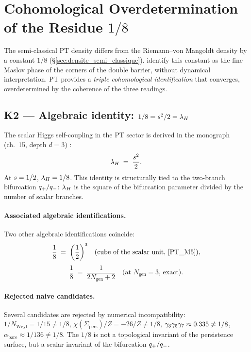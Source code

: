 \section{Cohomological Overdetermination of the Residue $1/8$}
\label{sec:surdetermination_un_huitieme}

The semi-classical PT density differs from the Riemann--von Mangoldt
density by a constant $1/8$ (\S\ref{sec:densite_semi_classique}).
\citeauthor{BerryKeating1999} \citeyear{BerryKeating1999} identify
this constant as the fine Maslov phase of the corners of the double
barrier, without dynamical interpretation. PT provides a \emph{triple
cohomological identification} that converges, overdetermined by the
coherence of the three readings.

\subsection{K2 --- Algebraic identity: $1/8 = s^{2}/2 = \lambda_H$}
\label{sec:K2}

The scalar Higgs self-coupling in the PT sector is derived in the
monograph (ch.~15, depth $d = 3$) \cite{PT_Foundations}:
\begin{equation}
\lambda_H \;=\; \dfrac{s^{2}}{2}.
\label{eq:lambdaH}
\end{equation}
At $s = 1/2$, $\lambda_H = 1/8$. This identity is structurally
tied to the two-branch bifurcation $q_{+}/q_{-}$: $\lambda_H$ is
the square of the bifurcation parameter divided by the number of
scalar branches.

\paragraph{Associated algebraic identifications.}
Two other algebraic identifications coincide:
\[
\dfrac{1}{8} \;=\; \bigg(\dfrac{1}{2}\bigg)^{3}
\quad \text{(cube of the scalar unit, \cite{PT_M5})},
\]
\[
\dfrac{1}{8} \;=\; \dfrac{1}{2 N_{\mathrm{gen}} + 2}
\quad \text{(at $N_{\mathrm{gen}} = 3$, exact)}.
\]

\paragraph{Rejected naive candidates.}
Several candidates are rejected by numerical incompatibility:
$1/N_{\mathrm{Weyl}} = 1/15 \ne 1/8$,
$\chi(\Sigma_{\mathrm{pers}})/Z = -26/Z \ne 1/8$,
$\gamma_{3} \gamma_{5} \gamma_{7} \approx 0.335 \ne 1/8$,
$\alpha_{\mathrm{bare}} \approx 1/136 \ne 1/8$. The $1/8$ is not a
topological invariant of the persistence surface, but a scalar
invariant of the bifurcation $q_{+}/q_{-}$.

